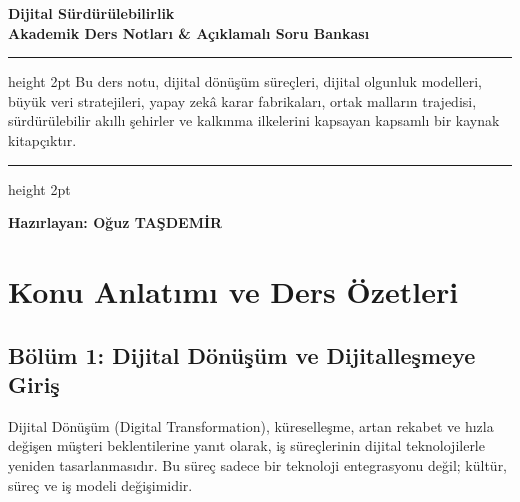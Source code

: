 \documentclass[11pt,a4paper,openany]{book}
\begin{document}
\shorthandoff{=}

% 
% 
\begin{titlepage}
    \centering
    \vspace*{2cm}
    {\huge\bfseries\sffamily Dijital Sürdürülebilirlik}\\[0.5cm]
    {\Large\bfseries Akademik Ders Notları \& Açıklamalı Soru Bankası}\\[1.5cm]
    
    \hrule height 2pt
    \vspace{0.8cm}
    {\large Bu ders notu, dijital dönüşüm süreçleri, dijital olgunluk modelleri,}\\[0.2cm]
    {\large büyük veri stratejileri, yapay zekâ karar fabrikaları, ortak malların trajedisi,}\\[0.2cm]
    {\large sürdürülebilir akıllı şehirler ve kalkınma ilkelerini kapsayan kapsamlı bir kaynak kitapçıktır.}\\[0.8cm]
    \hrule height 2pt
    \vspace{1.5cm}
    
    {\Large\bfseries Hazırlayan: Oğuz TAŞDEMİR}\\[1.5cm]
    
\end{titlepage}

\tableofcontents
\newpage

\chapter{Konu Anlatımı ve Ders Özetleri}

\section{Bölüm 1: Dijital Dönüşüm ve Dijitalleşmeye Giriş}
Dijital Dönüşüm (Digital Transformation), küreselleşme, artan rekabet ve hızla değişen müşteri beklentilerine yanıt olarak, iş süreçlerinin dijital teknolojilerle yeniden tasarlanmasıdır. Bu süreç sadece bir teknoloji entegrasyonu değil; kültür, süreç ve iş modeli değişimidir. 
\end{document}
